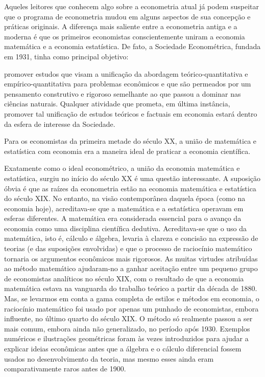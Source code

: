 \documentclass[12pt]{article}
\begin{document}
Aqueles leitores que conhecem algo sobre a econometria atual já podem suspeitar que o programa de econometria mudou em alguns aspectos de sua concepção e práticas originais. A diferença mais saliente entre a econometria antiga e a moderna é que os primeiros economistas conscientemente uniram a economia matemática e a economia estatística. De fato, a Sociedade Econométrica, fundada em 1931, tinha como principal objetivo:

promover estudos que visam a unificação da abordagem teórico-quantitativa e empírico-quantitativa para problemas econômicos e que são permeados por um pensamento construtivo e rigoroso semelhante ao que passou a dominar nas ciências naturais. Qualquer atividade que prometa, em última instância, promover tal unificação de estudos teóricos e factuais em economia estará dentro da esfera de interesse da Sociedade.

Para os economistas da primeira metade do século XX, a união de matemática e estatística com economia era a maneira ideal de praticar a economia científica.

Exatamente como o ideal econométrico, a união da economia matemática e estatística, surgiu no início do século XX é uma questão interessante. A suposição óbvia é que as raízes da econometria estão na economia matemática e estatística do século XIX. No entanto, na visão contemporânea daquela época (como na economia hoje), acreditava-se que a matemática e a estatística operavam em esferas diferentes. A matemática era considerada essencial para o avanço da economia como uma disciplina científica dedutiva. Acreditava-se que o uso da matemática, isto é, cálculo e álgebra, levaria à clareza e concisão na expressão de teorias (e das suposições envolvidas) e que o processo de raciocínio matemático tornaria os argumentos econômicos mais rigorosos. As muitas virtudes atribuídas ao método matemático ajudaram-no a ganhar aceitação entre um pequeno grupo de economistas analíticos no século XIX, com o resultado de que a economia matemática estava na vanguarda do trabalho teórico a partir da década de 1880. Mas, se levarmos em conta a gama completa de estilos e métodos em economia, o raciocínio matemático foi usado por apenas um punhado de economistas, embora influente, no último quarto do século XIX. O método só realmente passou a ser mais comum, embora ainda não generalizado, no período após 1930. Exemplos numéricos e ilustrações geométricas foram às vezes introduzidos para ajudar a explicar ideias econômicas antes que a álgebra e o cálculo diferencial fossem usados no desenvolvimento da teoria, mas mesmo esses ainda eram comparativamente raros antes de 1900.
\end{document}
